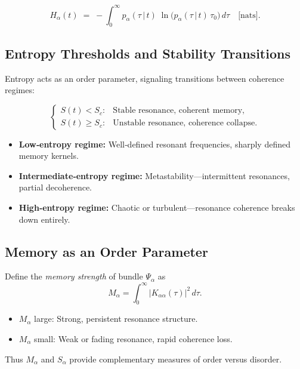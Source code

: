 \begin{equation}
  H_{\alpha}(t)
  \;=\;
  -\int_{0}^{\infty}\! p_{\alpha}(\tau\,|\,t)\;
     \ln\!\bigl(p_{\alpha}(\tau\,|\,t)\,\tau_{0}\bigr)\,d\tau
  \quad\text{[nats].}
\end{equation}

\subsection{Entropy Thresholds and Stability Transitions}

Entropy acts as an order parameter, signaling transitions between coherence regimes:

\[
  \begin{cases}
    S(t) < S_{c}: & \text{Stable resonance, coherent memory,} \\
    S(t) \ge S_{c}: & \text{Unstable resonance, coherence collapse.}
  \end{cases}
\]

\begin{itemize}
  \item \textbf{Low‐entropy regime:} Well‐defined resonant frequencies, sharply defined memory kernels.
  \item \textbf{Intermediate‐entropy regime:} Metastability—intermittent resonances, partial decoherence.
  \item \textbf{High‐entropy regime:} Chaotic or turbulent—resonance coherence breaks down entirely.
\end{itemize}

\subsection{Memory as an Order Parameter}

Define the \emph{memory strength} of bundle \(\Psi_{\alpha}\) as
\begin{equation}
  M_{\alpha}
  = \int_{0}^{\infty}
      \bigl|K_{\alpha\alpha}(\tau)\bigr|^{2}
    \,d\tau.
\end{equation}
\begin{itemize}
  \item \(\displaystyle M_{\alpha}\) large: Strong, persistent resonance structure.
  \item \(\displaystyle M_{\alpha}\) small: Weak or fading resonance, rapid coherence loss.
\end{itemize}
Thus \(M_{\alpha}\) and \(S_{\alpha}\) provide complementary measures of order versus disorder.

